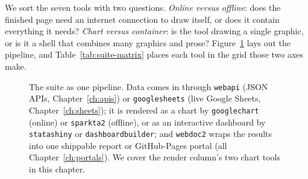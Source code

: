 We sort the seven tools with two questions. \emph{Online versus offline}: does the finished page need an internet connection to draw itself, or does it contain everything it needs? \emph{Chart versus container}: is the tool drawing a single graphic, or is it a shell that combines many graphics and prose? Figure~\ref{fig:suite-pipeline} lays out the pipeline, and Table~\ref{tab:suite-matrix} places each tool in the grid those two axes make.

\begin{figure}[htbp]
\centering
{}
\caption[The visualization suite pipeline]{The suite as one pipeline. Data comes in through \texttt{webapi} (JSON APIs, Chapter~\ref{ch:apis}) or \texttt{googlesheets} (live Google Sheets, Chapter~\ref{ch:sheets}); it is rendered as a chart by \texttt{googlechart} (online) or \texttt{sparkta2} (offline), or as an interactive dashboard by \texttt{statashiny} or \texttt{dashboardbuilder}; and \texttt{webdoc2} wraps the results into one shippable report or GitHub-Pages portal (all Chapter~\ref{ch:portals}). We cover the render column's two chart tools in this chapter.}
\label{fig:suite-pipeline}
\end{figure}

